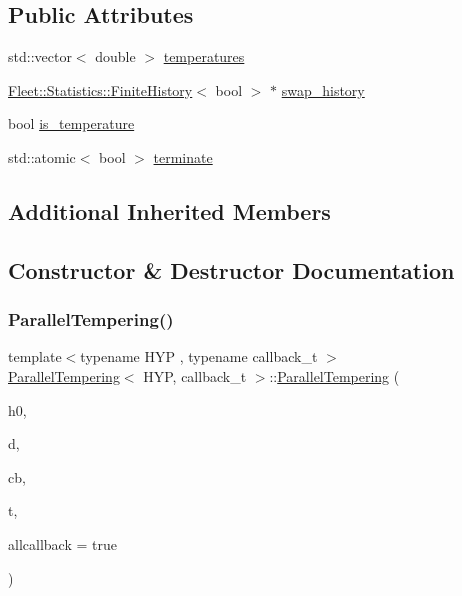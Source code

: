 \subsection*{Public Attributes}
\begin{DoxyCompactItemize}
\item 
std\+::vector$<$ double $>$ \hyperlink{class_parallel_tempering_a5aca1e6ca522986f183d61c91c94d21d}{temperatures}
\item 
\hyperlink{class_fleet_1_1_statistics_1_1_finite_history}{Fleet\+::\+Statistics\+::\+Finite\+History}$<$ bool $>$ $\ast$ \hyperlink{class_parallel_tempering_a86a7b77250a04b5df502f1c770cf51bf}{swap\+\_\+history}
\item 
bool \hyperlink{class_parallel_tempering_ae9f0a2af938df838cc4010983860394e}{is\+\_\+temperature}
\item 
std\+::atomic$<$ bool $>$ \hyperlink{class_parallel_tempering_acda523b375468743e7d8ac471af65285}{terminate}
\end{DoxyCompactItemize}
\subsection*{Additional Inherited Members}


\subsection{Constructor \& Destructor Documentation}
\mbox{\label{class_parallel_tempering_abac520918d0d6915c61d9595a82b01eb}} 
\subsubsection{\texorpdfstring{Parallel\+Tempering()}{ParallelTempering()}\hspace{0.1cm}{\footnotesize\ttfamily [1/3]}}
{\footnotesize\ttfamily template$<$typename H\+YP , typename callback\+\_\+t $>$ \\
\hyperlink{class_parallel_tempering}{Parallel\+Tempering}$<$ H\+YP, callback\+\_\+t $>$\+::\hyperlink{class_parallel_tempering}{Parallel\+Tempering} (\begin{DoxyParamCaption}\item[{H\+YP \&}]{h0,  }\item[{typename H\+Y\+P\+::t\+\_\+data $\ast$}]{d,  }\item[{callback\+\_\+t \&}]{cb,  }\item[{std\+::initializer\+\_\+list$<$ double $>$}]{t,  }\item[{bool}]{allcallback = {\ttfamily true} }\end{DoxyParamCaption})\hspace{0.3cm}{\ttfamily [inline]}}

